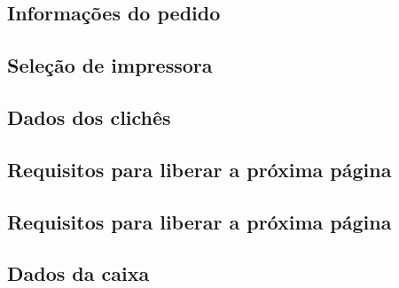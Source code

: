 \thispagestyle{fancy}
\vspace{\fill}
\subsection{\small Informações do pedido}
\begin{figure}
    \centering
    
\end{figure}
\newpage

\thispagestyle{fancy}
\vspace{\fill}
\subsection{\small Seleção de impressora}
\begin{figure}
    \centering
    
\end{figure}
\newpage

\thispagestyle{fancy}
\vspace{\fill}
\subsection{\small Dados dos clichês}
\begin{figure}
    \centering
    
\end{figure}
\newpage

\thispagestyle{fancy}
\vspace{\fill}
\subsection{\small Requisitos para liberar a próxima página}
\begin{figure}
    \centering
    
\end{figure}
\newpage

\thispagestyle{fancy}
\vspace{\fill}
\subsection{\small Requisitos para liberar a próxima página}
\begin{figure}
    \centering
    
\end{figure}
\newpage

\thispagestyle{fancy}
\vspace{\fill}
\subsection{\small Dados da caixa}
\begin{figure}
    \centering
    
\end{figure}
\newpage

